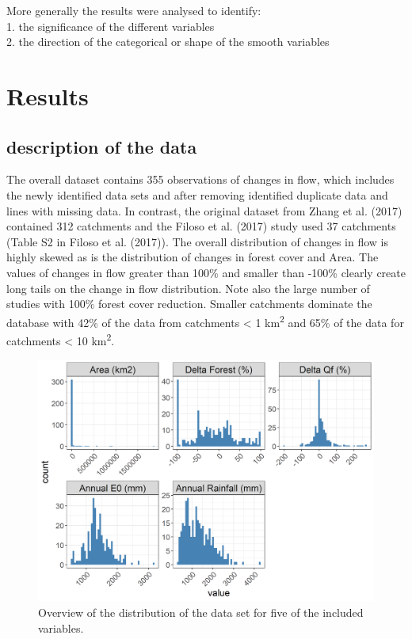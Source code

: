 \documentclass[]{elsarticle} %
\begin{document}
More generally the results were analysed to identify:\\
1. the significance of the different variables\\
2. the direction of the categorical or shape of the smooth variables

\hypertarget{results}{%
\section{Results}\label{results}}

\hypertarget{description-of-the-data}{%
\subsection{description of the data}\label{description-of-the-data}}

The overall dataset contains 355 observations of changes in flow, which includes the newly identified data sets and after removing identified duplicate data and lines with missing data. In contrast, the original dataset from Zhang et al. (2017) contained 312 catchments and the Filoso et al. (2017) study used 37 catchments (Table S2 in Filoso et al. (2017)). The overall distribution of changes in flow is highly skewed as is the distribution of changes in forest cover and Area. The values of changes in flow greater than 100\% and smaller than -100\% clearly create long tails on the change in flow distribution. Note also the large number of studies with 100\% forest cover reduction. Smaller catchments dominate the database with 42\% of the data from catchments \textless{} 1 km\textsuperscript{2} and 65\% of the data for catchments \textless{} 10 km\textsuperscript{2}.



\begin{figure}
\includegraphics[width=0.9\linewidth]{./DataExploration} \caption{Overview of the distribution of the data set for five of the included variables.}\label{fig:datagraphs}
\end{figure}
\end{document}
